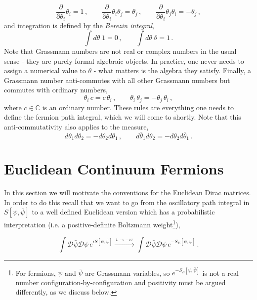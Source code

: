\documentclass[11pt]{article}
\newcommand{\sideex}[1]{\marginnote{\footnotesize\textcolor{red!50!black}{#1}}}
\theoremstyle{definition}
\begin{document}
\begin{equation}\label{eqn:grass_diff}
    \frac{\partial}{\partial \theta_i} \theta_i = 1\,, \qquad \frac{\partial}{\partial \theta_i} \theta_i \theta_j = \theta_j\,, \qquad \frac{\partial}{\partial \theta_i} \theta_j \theta_i = -\theta_j\,,
\end{equation}
and integration is defined by the \textit{Berezin integral}\sideex{This will be relevant in the exercises when you compute the fermion path integral!},
\begin{equation}
    \int d\theta \; 1 = 0\,, \qquad \int d\theta \; \theta = 1\,.
\end{equation}
Note that Grassmann numbers are not real or complex numbers in the usual sense - they are purely formal algebraic objects. In practice, one never needs to assign a numerical value to $\theta$ - what matters is the algebra they satisfy. Finally, a Grassmann number anti-commutes with all other Grassmann numbers but commutes with ordinary numbers,
\begin{equation}
    \theta_i \, c = c \, \theta_i \,, \qquad \theta_i \, \theta_j = - \theta_j \, \theta_i \,,
\end{equation}
where $c \in \mathbb{C}$ is an ordinary number. These rules are everything one needs to define the fermion path integral, which we will come to shortly. Note that this anti-commutativity also applies to the measure,
\begin{equation}
    d\theta_1 d\theta_2 = - d\theta_2 d\theta_1 \,, \qquad d\bar{\theta}_1 d\theta_2 = - d\theta_2 d\bar{\theta}_1 \,.
\end{equation}

\section{Euclidean Continuum Fermions}
In this section we will motivate the conventions for the Euclidean Dirac matrices. 
In order to do this recall that we want to go from the oscillatory path integral in 
$S[\psi,\bar{\psi}]$ to a well defined Euclidean version which has a probabilistic 
interpretation (i.e. a positive-definite Boltzmann weight\footnote{For fermions, $\psi$ and $\bar{\psi}$ are Grassmann variables, so $e^{-S_E[\psi,\bar{\psi}]}$ is not a real number configuration-by-configuration 
and positivity must be argued differently, as we discuss below.}),

\begin{equation}
    \int \mathcal{D} \bar{\psi} \mathcal{D}\psi \, e^{i S[\psi,\bar{\psi}]} 
    \xrightarrow{\;t\to -i\tau\;} 
    \int \mathcal{D} \bar{\psi} \mathcal{D}\psi \, e^{- S_E[\psi,\bar{\psi}]} \,.
\end{equation}
\end{document}
